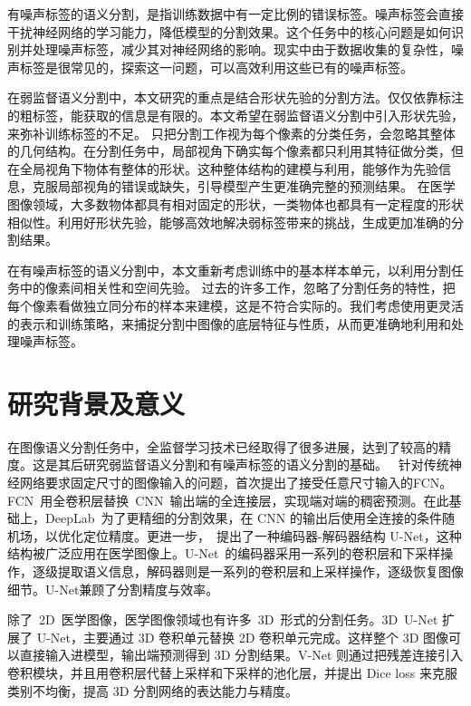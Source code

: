 有噪声标签的语义分割，是指训练数据中有一定比例的错误标签。噪声标签会直接干扰神经网络的学习能力，降低模型的分割效果。这个任务中的核心问题是如何识别并处理噪声标签，减少其对神经网络的影响。现实中由于数据收集的复杂性，噪声标签是很常见的，探索这一问题，可以高效利用这些已有的噪声标签。

在弱监督语义分割中，本文研究的重点是结合形状先验的分割方法。仅仅依靠标注的粗标签，能获取的信息是有限的。本文希望在弱监督语义分割中引入形状先验，来弥补训练标签的不足。
只把分割工作视为每个像素的分类任务，会忽略其整体的几何结构。在分割任务中，局部视角下确实每个像素都只利用其特征做分类，但在全局视角下物体有整体的形状。这种整体结构的建模与利用，能够作为先验信息，克服局部视角的错误或缺失，引导模型产生更准确完整的预测结果。
在医学图像领域，大多数物体都具有相对固定的形状，一类物体也都具有一定程度的形状相似性。利用好形状先验，能够高效地解决弱标签带来的挑战，生成更加准确的分割结果。

在有噪声标签的语义分割中，本文重新考虑训练中的基本样本单元，以利用分割任务中的像素间相关性和空间先验。
过去的许多工作，忽略了分割任务的特性，把每个像素看做独立同分布的样本来建模，这是不符合实际的。我们考虑使用更灵活的表示和训练策略，来捕捉分割中图像的底层特征与性质，从而更准确地利用和处理噪声标签。


\section{研究背景及意义}
在图像语义分割任务中，全监督学习技术已经取得了很多进展，达到了较高的精度。这是其后研究弱监督语义分割和有噪声标签的语义分割的基础。
\citet{long2015fully}~针对传统神经网络要求固定尺寸的图像输入的问题，首次提出了接受任意尺寸输入的FCN。FCN~用全卷积层替换~CNN~输出端的全连接层，实现端对端的稠密预测。在此基础上，DeepLab~为了更精细的分割效果，在 CNN 的输出后使用全连接的条件随机场，以优化定位精度。更进一步，\citet{ronneberger2015u}~提出了一种编码器-解码器结构 U-Net，这种结构被广泛应用在医学图像上。U-Net~的编码器采用一系列的卷积层和下采样操作，逐级提取语义信息，解码器则是一系列的卷积层和上采样操作，逐级恢复图像细节。U-Net兼顾了分割精度与效率。

除了~2D~医学图像，医学图像领域也有许多~3D~形式的分割任务。3D~U-Net 扩展了 U-Net，主要通过 3D 卷积单元替换 2D 卷积单元完成。这样整个 3D 图像可以直接输入进模型，输出端预测得到 3D 分割结果。V-Net 则通过把残差连接引入卷积模块，并且用卷积层代替上采样和下采样的池化层，并提出 Dice loss 来克服类别不均衡，提高 3D 分割网络的表达能力与精度。

